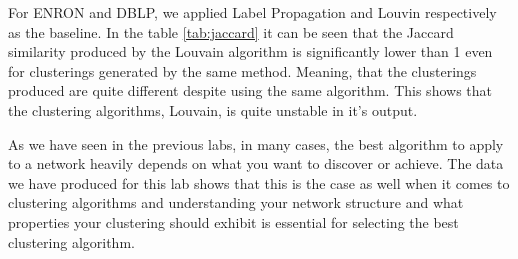 For ENRON and DBLP, we applied Label Propagation and Louvin respectively as the baseline. In the table \ref{tab:jaccard} it can be seen that the Jaccard similarity produced by the Louvain algorithm is significantly lower than 1 even for clusterings generated by the same method. Meaning, that the clusterings produced are quite different despite using the same algorithm. This shows that the clustering algorithms, Louvain, is quite unstable in it's output.

As we have seen in the previous labs, in many cases, the best algorithm to apply to a network heavily depends on what you want to discover or achieve. The data we have produced for this lab shows that this is the case as well when it comes to clustering algorithms and understanding your network structure and what properties your clustering should exhibit is essential for selecting the best clustering algorithm.
